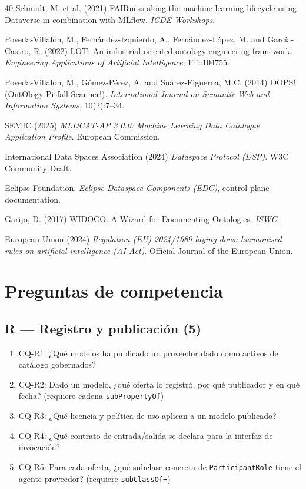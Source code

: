 \documentclass[11pt,a4paper]{article}
\newcommand{\code}[1]{\texttt{#1}}
\newcommand{\cq}[1]{\textsf{#1}}
\begin{document}
\begin{thebibliography}{40}
 Schmidt, M. et al. (2021) FAIRness along the machine learning lifecycle using Dataverse in combination with MLflow. \emph{ICDE Workshops}.

 Poveda-Villalón, M., Fernández-Izquierdo, A., Fernández-López, M. and García-Castro, R. (2022) LOT: An industrial oriented ontology engineering framework. \emph{Engineering Applications of Artificial Intelligence}, 111:104755.

 Poveda-Villalón, M., Gómez-Pérez, A. and Suárez-Figueroa, M.C. (2014) OOPS! (OntOlogy Pitfall Scanner!). \emph{International Journal on Semantic Web and Information Systems}, 10(2):7--34.

 SEMIC (2025) \emph{MLDCAT-AP 3.0.0: Machine Learning Data Catalogue Application Profile}. European Commission.

 International Data Spaces Association (2024) \emph{Dataspace Protocol (DSP)}. W3C Community Draft.

 Eclipse Foundation. \emph{Eclipse Dataspace Components (EDC)}, control-plane documentation.

 Garijo, D. (2017) WIDOCO: A Wizard for Documenting Ontologies. \emph{ISWC}.

 European Union (2024) \emph{Regulation (EU) 2024/1689 laying down harmonised rules on artificial intelligence (AI Act)}. Official Journal of the European Union.

\end{thebibliography}

\appendix

\section{Preguntas de competencia}\label{app:cqs}

\subsection*{R --- Registro y publicación (5)}
\begin{enumerate}[label=\arabic*., leftmargin=*]
\item \cq{CQ-R1}: ¿Qué modelos ha publicado un proveedor dado como activos de catálogo gobernados?
\item \cq{CQ-R2}: Dado un modelo, ¿qué oferta lo registró, por qué publicador y en qué fecha? (requiere cadena \code{subPropertyOf})
\item \cq{CQ-R3}: ¿Qué licencia y política de uso aplican a un modelo publicado?
\item \cq{CQ-R4}: ¿Qué contrato de entrada/salida se declara para la interfaz de invocación?
\item \cq{CQ-R5}: Para cada oferta, ¿qué subclase concreta de \code{ParticipantRole} tiene el agente proveedor? (requiere \code{subClassOf+})
\end{enumerate}
\end{document}

